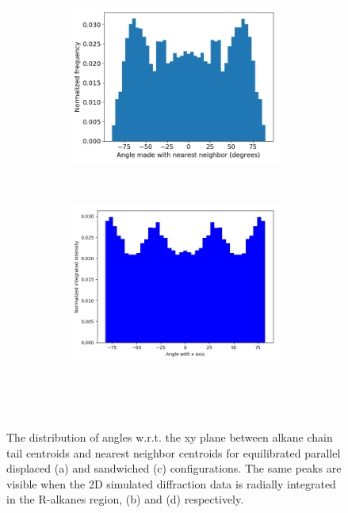 \documentclass{article}
\begin{document}
\begin{figure}
	\begin{subfigure}{\linewidth}
	\centering
		\begin{subfigure}{0.45\textwidth}
	        \centering
		        \includegraphics[width=\linewidth]{angles_traj_layered.png}
		        \caption{}~\label{fig:rz_layered}
		\end{subfigure}
		\begin{subfigure}{0.45\textwidth}
        	\centering
		        \includegraphics[width=\linewidth]{layered_angle_v_I.png}
		        \caption{}~\label{fig:layered_integration}
		\end{subfigure}
	\end{subfigure}
  \caption{The distribution of angles w.r.t. the xy plane between alkane chain tail centroids and nearest
  neighbor centroids for equilibrated parallel displaced (a) and sandwiched (c) configurations. The
  same peaks are visible when the 2D simulated diffraction data is radially integrated in the R-alkanes region,
  (b) and (d) respectively.}~\label{fig:tail_packing}
  \end{figure}
\end{document}
